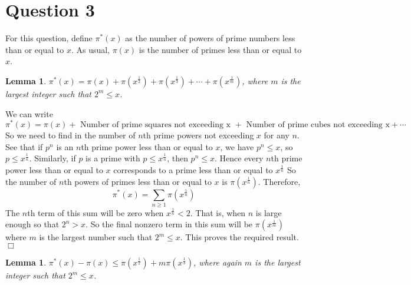 \documentclass[10pt]{article}
\newtheorem{lemma}[theorem]{Lemma}
\newenvironment{proof}[1][Proof]{\begin{trivlist}
\item[\hskip \labelsep {\bfseries #1}]}{\end{trivlist}}
\begin{document}
\section*{Question 3}
For this question, define $\pi^*(x)$
as the number of powers of prime numbers less than or equal to $x$.
As usual, $\pi(x)$ is the number of primes less than or equal to $x$.
\begin{lemma}
\label{piStarFormula}
    $\pi^*(x) = \pi(x)+\pi(x^\frac{1}{2})+\pi(x^{\frac{1}{3}})+\cdots+\pi(x^\frac{1}{m})$,
    where $m$ is the largest integer such that $2^m\leq x$.
\end{lemma}
\begin{proof}
    We can write
    \begin{equation*}
        \pi^*(x) = \pi(x)+\text{ Number of prime squares not exceeding x }+\text{ Number of prime
        cubes not exceeding x} +\cdots
    \end{equation*}
    So we need to find in the number of $n$th prime powers not exceeding $x$ for
    any $n$. See that if $p^n$ is an $n$th prime power less than or equal to $x$,
    we have $p^n \leq x$, so $p \leq x^\frac{1}{n}$. Similarly, if $p$
    is a prime with $p \leq x^\frac{1}{n}$, then $p^n\leq x$. Hence
    every $n$th prime power less than or equal to $x$ corresponds
    to a prime less than or equal to $x^{\frac{1}{n}}$
    So the number of $n$th powers of primes less than or equal to $x$
    is $\pi(x^\frac{1}{n})$.
    Therefore,
    \begin{equation*}
        \pi^*(x) = \sum_{n\geq 1} \pi(x^\frac{1}{n})
    \end{equation*}
    The $n$th term of this sum will be zero when $x^\frac{1}{n} < 2$. That is,
    when $n$ is large enough so that $2^n > x$. So 
    the final nonzero term in this sum will be $\pi(x^{\frac{1}{m}})$ where
    $m$ is the largest number such that $2^m \leq x$.
    This proves the required result. $\Box$
\end{proof}
\begin{lemma}
\label{piBound}
    $\pi^*(x)-\pi(x) \leq \pi(x^\frac{1}{2})+m\pi(x^\frac{1}{3})$, where
    again $m$ is the largest integer
    such that $2^m\leq x$.
\end{lemma} 
\end{document}
